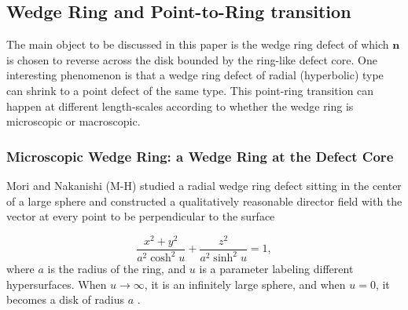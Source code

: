 \documentclass[nottitlepage]{article}
\begin{document}
 \subsection{Wedge Ring and Point-to-Ring transition}\label{sec:aaaa2}
 
The main object to be discussed in this paper is the wedge ring defect of which $\mathbf{n}$ is chosen to reverse across the disk bounded by the ring-like defect core. One interesting phenomenon is that a wedge ring defect of radial (hyperbolic) type can shrink to a point defect of the same type. This point-ring transition can happen at different length-scales according to whether the wedge ring is microscopic or macroscopic.
 \subsubsection{Microscopic Wedge Ring: a Wedge Ring at the Defect Core}\label{ssssec:micro wr}


Mori and Nakanishi (M-H) studied a radial wedge ring defect sitting in the center of a large sphere and constructed a qualitatively reasonable director field with the vector at every point to be perpendicular to the surface

     \begin{equation}\label{eq:x}
     \frac{x^2+y^2}{a^2\cosh^2u}+\frac{z^2}{a^2\sinh^2u}=1,
      \end{equation}
      where $a$ is the radius of the ring, and $u$ is a parameter labeling different hypersurfaces. When $u\to\infty$, it is an infinitely large sphere, and when $u=0$, it becomes a disk of radius $a$ \cite{mori}. 
      
\end{document}
